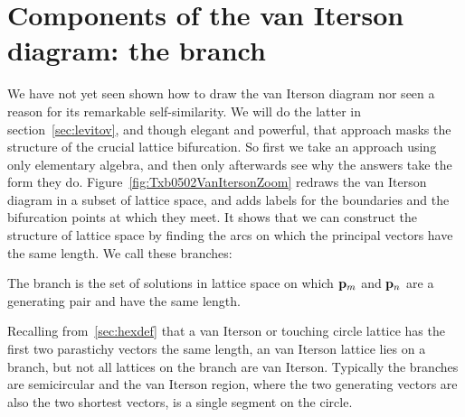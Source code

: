 \section{Components of the van Iterson diagram: the  branch}
\label{sec:mequalsn}
We have not yet seen shown how to draw the van Iterson diagram nor seen a reason for its remarkable self-similarity. We will do the latter in section~\ref{sec:levitov}, and though elegant and powerful, that approach masks the structure of the crucial lattice bifurcation.  So first we take an approach using only elementary algebra, and then only afterwards see why the answers take the form they do. 
Figure~\ref{fig:Txb0502VanItersonZoom} redraws 
the van Iterson diagram in a subset of lattice space, and adds labels for the boundaries and the bifurcation points at which they meet. 
%
It shows that we can construct the structure of lattice space by finding the arcs on which  the principal vectors have the same length. We call these branches: 
\begin{definition}
The branch   is the set of solutions in lattice space on which ${\mathbf p}_{m}$ and ${\mathbf p}_{n}$ are a generating pair and have the same length.
\end{definition}
Recalling from~\ref{sec:hexdef} that a van Iterson or touching circle lattice has the first two parastichy vectors the same length, an  van Iterson lattice 
 lies on a  branch, but not all lattices on the branch are van Iterson.   Typically the branches are semicircular and the van Iterson region, where the two generating vectors are also the two shortest vectors, is a single segment on the circle. 


